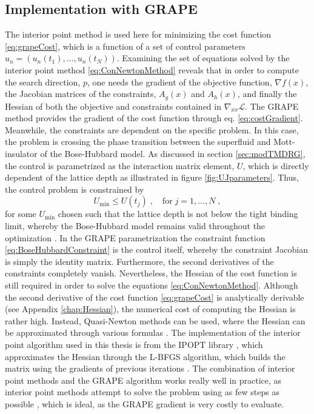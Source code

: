 \subsection{Implementation with GRAPE} \label{sec:IpoptGRAPE}
The interior point method is used here for minimizing the cost function \eqref{eq:grapeCost}, which is a function of a set of control parameters $u_n = \left( u_n (t_1) , \ldots , u_n (t_N)  \right)$. Examining the set of equations solved by the interior point method \eqref{eq:ConNewtonMethod} reveals that in order to compute the search direction, $p$, one needs the gradient of the objective function, $\nabla f(x)$, the Jacobian matrices of the constraints, $A_g (x)$ and $A_h (x)$, and finally the Hessian of both the objective and constraints contained in $\nabla_{xx} \mathcal{L}$.
The GRAPE method provides the gradient of the cost function through eq. \eqref{eq:costGradient}. 
Meanwhile, the constraints are dependent on the specific problem. In this case, the problem is crossing the phase transition between the superfluid and Mott-insulator of the Bose-Hubbard model. As discussed in section \ref{sec:modTMDRG}, the control is parametrized as the interaction matrix element, $U$, which is directly dependent of the lattice depth as illustrated in figure \ref{fig:UJparameters}. Thus, the control problem is constrained by 
\begin{equation}
	U_{\mathrm{min}} \leq U(t_j) \; , \quad \mathrm{for} \; j = 1 , \ldots , N \; ,
	\label{eq:BoseHubbardConstraint}
\end{equation} 
for some $U_{\mathrm{min}}$ chosen such that the lattice depth is not below the tight binding limit, whereby the Bose-Hubbard model remains valid throughout the optimization \cite{manybodyBloch}. In the GRAPE parametrization the constraint function \eqref{eq:BoseHubbardConstraint} is the control itself, whereby the constraint Jacobian is simply the identity matrix. 
Furthermore, the second derivatives of the constraints completely vanish. Nevertheless, the Hessian of the cost function is still required in order to solve the equations \eqref{eq:ConNewtonMethod}. Although the second derivative of the cost function \eqref{eq:grapeCost} is analytically derivable (see Appendix \ref{chap:Hessian}), the numerical cost of computing the Hessian is rather high. Instead, Quasi-Newton methods can be used, where the Hessian can be approximated through various formulas \cite{wright}. The implementation of the interior point algorithm used in this thesis is from the IPOPT library \cite{Wachter2006}, which approximates the Hessian through the L-BFGS algorithm, which builds the matrix using the gradients of previous iterations \cite{Liu1989}. The combination of interior point methods and the GRAPE algorithm works really well in practice, as interior point methods attempt to solve the problem using as few steps as possible \cite{wright}, which is ideal, as the GRAPE gradient is very costly to evaluate.



